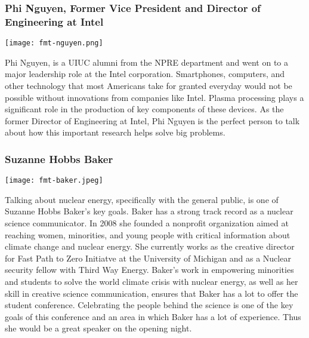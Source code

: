 \subsubsection{Phi Nguyen, Former Vice President and Director of Engineering at Intel}
\begin{minipage}{0.25\textwidth}
	\centering
	\texttt{[image: fmt-nguyen.png]}
\end{minipage}
\begin{minipage}{0.73\textwidth}
Phi Nguyen, is a UIUC alumni from the NPRE department and went on to a major leadership role at the Intel corporation. Smartphones, computers, and other technology that most Americans take for granted everyday would not be possible without innovations from companies like Intel. Plasma processing plays a significant role in the production of key components of these devices. As the former Director of Engineering at Intel, Phi Nguyen is the perfect person to talk about how this important research helps solve big problems. 
	
\end{minipage}

\subsubsection{Suzanne Hobbs Baker}
\begin{minipage}{0.25\textwidth}
	\centering
	\texttt{[image: fmt-baker.jpeg]}
\end{minipage}
\begin{minipage}{0.73\textwidth}
	Talking about nuclear energy, specifically with the general public, is one of Suzanne Hobbs Baker's key goals. Baker has a strong track record as a nuclear science communicator. In 2008 she founded a nonprofit organization aimed at reaching women, minorities, and young people with critical information about climate change and nuclear energy. She currently works as the creative director for Fast Path to Zero Initiatve at the University of Michigan and as a Nuclear security fellow with Third Way Energy. Baker's work in empowering minorities and students to solve the world climate crisis with nuclear energy, as well as her skill in creative science communication, ensures that Baker has a lot to offer the student conference. Celebrating the people behind the science is one of the key goals of this conference and an area in which Baker has a lot of experience. Thus she would be a great speaker on the opening night.
\end{minipage}

